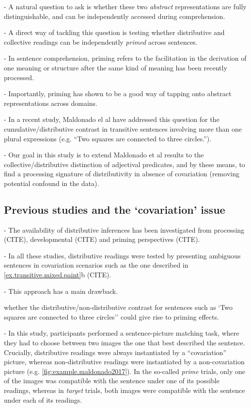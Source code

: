 \documentclass[a4paper]{article}
\begin{document}
- A natural question to ask is whether these two \emph{abstract} representations are fully distinguishable, and can be independently accessed during comprehension.

- A direct way of tackling this question is testing whether distributive and collective readings can be independently \emph{primed} across sentences. 

- In sentence comprehension, priming refers to the facilitation in the derivation of one meaning or structure after the same kind of meaning has been recently processed. 

- Importantly, priming has shown to be a good way of tapping onto abstract representations across domains. 

- In a recent study, Maldonado el al have addressed this question for the cumulative/distributive contrast in transitive sentences involving more than one plural expressions (e.g. ``Two squares are connected to three circles.''). 


- Our goal in this study is to extend Maldonado et al results to the collective/distributive distinction of adjectival predicates, and by these means, to find a processing signature of distributivity in absence of covariation (removing potential confound in the data). 


\subsection{Previous studies and the `covariation' issue}

- The availability of distributive inferences has been investigated from processing (CITE), developmental (CITE) and priming perspectives (CITE). 

- In all these studies, distributive readings were tested by presenting ambiguous sentences in covariation scenarios such as the one described in \ref{ex.transitive.mixed.paint}b (CITE). 

- This approach has a main drawback. 


whether the distributive/non-distributive contrast for sentences such as `Two squares are connected to three circles'' could give rise to priming effects. 

- In this study, participants performed a sentence-picture matching task, where they had to choose between two images the one that best described the sentence. Crucially, distributive readings were always instantiated by a ``covariation'' picture, whereas non-distributive readings were instantiated by a non-covariation picture (e.g. \ref{fig:example.maldonado2017}). 
In the so-called \emph{prime} trials, only one of the images was compatible with the sentence under one of its possible readings, whereas in \emph{target} trials, both images were compatible with the sentence under each of its readings. 
\end{document}
